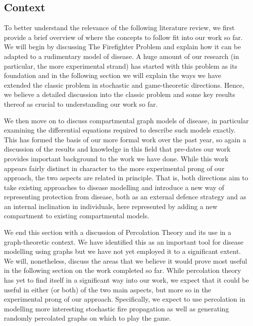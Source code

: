 \documentclass[../report.tex]{subfiles}
\begin{document}
\subsection{Context}

To better understand the relevance of the following literature review, we first provide a brief overview of where the concepts to follow fit into our work so far. We will begin by discussing The Firefighter Problem and explain how it can be adapted to a rudimentary model of disease. A huge amount of our research (in particular, the more experimental strand) has started with this problem as its foundation and in the following section we will explain the ways we have extended the classic problem in stochastic and game-theoretic directions. Hence, we believe a detailed discussion into the classic problem and some key results thereof as crucial to understanding our work so far.

We then move on to discuss compartmental graph models of disease, in particular examining the differential equations required to describe such models exactly. This has formed the basis of our more formal work over the past year, so again a discussion of the results and knowledge in this field that pre-dates our work provides important background to the work we have done. While this work appears fairly distinct in character to the more experimental prong of our approach, the two aspects are related in principle. That is, both directions aim to take existing approaches to disease modelling and introduce a new way of representing protection from disease, both as an external defence strategy and as an internal inclination in individuals, here represented by adding a new compartment to existing compartmental models.

We end this section with a discussion of Percolation Theory and its use in a graph-theoretic context. We have identified this as an important tool for disease modelling using graphs but we have not yet employed it to a significant extent. We will, nonetheless, discuss the areas that we believe it would prove most useful in the following section on the work completed so far. While percolation theory has yet to find itself in a significant way into our work, we expect that it could be useful in either (or both) of the two main aspects, but more so in the experimental prong of our approach. Specifically, we expect to use percolation in modelling more interesting stochastic fire propagation as well as generating randomly percolated graphs on which to play the game. 
\end{document}
